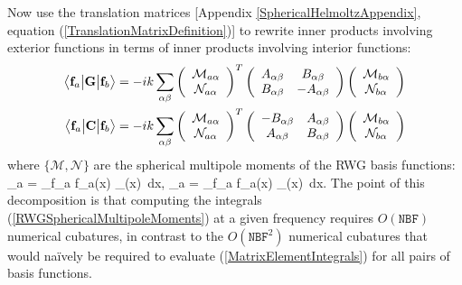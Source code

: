 \documentclass[letterpaper]{article}
\begin{document}
Now use the translation matrices 
[Appendix \ref{SphericalHelmoltzAppendix}, 
 equation (\ref{TranslationMatrixDefinition})]
to rewrite inner products involving exterior functions in terms
of inner products involving interior functions:
\begin{subequations}
\begin{align}
 \big\langle \mathbf{f}_a \big| \mathbf{G} \big| \mathbf{f}_b \big\rangle
&=-ik\sum_{\alpha\beta} 
   \left(\begin{array}{c}
     \mathcal{M}_{a\alpha}  \\ \mathcal{N}_{a\alpha}
   \end{array}\right)^T
   \left(\begin{array}{cc}
   A_{\alpha\beta} & B_{\alpha\beta} \\
   B_{\alpha\beta} & -A_{\alpha\beta}
   \end{array}\right)
   \left(\begin{array}{c}
     \mathcal{M}_{b\alpha}  \\ \mathcal{N}_{b\alpha}
   \end{array}\right)
\\
 \big\langle \mathbf{f}_a \big| \mathbf{C} \big| \mathbf{f}_b \big\rangle
&=-ik\sum_{\alpha\beta} 
   \left(\begin{array}{c}
     \mathcal{M}_{a\alpha}  \\ \mathcal{N}_{a\alpha}
   \end{array}\right)^T
   \left(\begin{array}{cc}
  -B_{\alpha\beta} & A_{\alpha\beta} \\
   A_{\alpha\beta} & B_{\alpha\beta}
   \end{array}\right)
   \left(\begin{array}{c}
     \mathcal{M}_{b\alpha}  \\ \mathcal{N}_{b\alpha}
   \end{array}\right)
\end{align}
\label{SphericalMultipoleMatrixElements}
\end{subequations}
where $\{ \mathcal{M}, \mathcal{N}\}$ are the spherical multipole moments
of the RWG basis functions:
{
   _{a\alpha}
   =
   \int_{\sup \vb f_a} \vb f_a(\vb x) \cdot \MInt_\alpha(\vb x)\, d\vb x,
   \qquad
   _{a\alpha}
   =
   \int_{\sup \vb f_a} \vb f_a(\vb x) \cdot \NInt_\alpha(\vb x)\, d\vb x.
}
The point of this decomposition is that computing the integrals
(\ref{RWGSphericalMultipoleMoments}) at a given frequency
requires $O(\texttt{NBF})$ numerical cubatures, in contrast to 
the $O(\texttt{NBF}^2)$ numerical cubatures that would na\"ively 
be required to evaluate (\ref{MatrixElementIntegrals}) for 
all pairs of basis functions.
\end{document}
